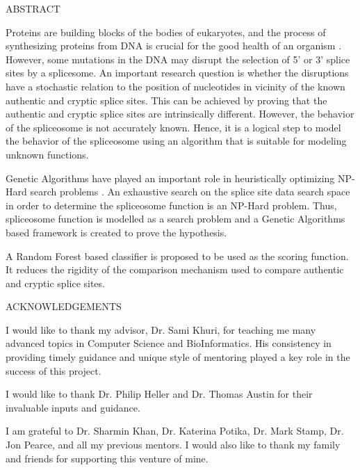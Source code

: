 \documentclass[12pt,a4paper]{article}
\begin{document}
	\begin{center}
		\large ABSTRACT\\
	\end{center}
	Proteins are building blocks of the bodies of eukaryotes, and the process of synthesizing proteins from DNA is crucial for the good health of an organism \cite{khuri3}. However, some mutations in the DNA may disrupt the selection of 5' or 3' splice sites by a splicesome. An important research question is whether the disruptions have a stochastic relation to the position of nucleotides in vicinity of the known authentic and cryptic splice sites. This can be achieved by proving that the authentic and cryptic splice sites are intrinsically different. However, the behavior of the spliceosome is not accurately known. Hence, it is a logical step to model the behavior of the spliceosome using an algorithm that is suitable for modeling unknown functions. \par
	Genetic Algorithms have played an important role in heuristically optimizing NP-Hard search problems \cite{handbook}. An exhaustive search on the splice site data search space in order to determine the spliceosome function is an NP-Hard problem. Thus, spliceosome function is modelled as a search problem and a Genetic Algorithms based framework is created to prove the hypothesis. \par
	A Random Forest based classifier is proposed to be used as the scoring function. It reduces the rigidity of the comparison mechanism used to compare authentic and cryptic splice sites.
    	
    \thispagestyle{empty}
    \newpage
	\begin{center}
		\large ACKNOWLEDGEMENTS\\
	\end{center}
	I would like to thank my advisor, Dr. Sami Khuri, for teaching me many advanced topics in Computer Science and BioInformatics. His consistency in providing timely guidance and unique style of mentoring played a key role in the success of this project.\par
	I would like to thank Dr. Philip Heller and Dr. Thomas Austin for their invaluable inputs and guidance. \par
	I am grateful to Dr. Sharmin Khan, Dr. Katerina Potika, Dr. Mark Stamp, Dr. Jon Pearce, and all my previous mentors.
	I would also like to thank my family and friends for supporting this venture of mine.

    \thispagestyle{empty}
	\newpage
	
\end{document}
